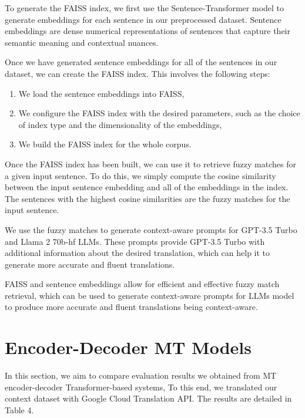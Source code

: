 \documentclass{article}
\begin{document}
To generate the FAISS index, we first use the Sentence-Transformer model to generate embeddings for each sentence in our preprocessed dataset. Sentence embeddings are dense numerical representations of sentences that capture their semantic meaning and contextual nuances.


Once we have generated sentence embeddings for all of the sentences in our dataset, we can create the FAISS index. This involves the following steps:


\begin{enumerate}
	\item We load the sentence embeddings into FAISS,
	
	
	\item We configure the FAISS index with the desired parameters, such as the choice of index type and the dimensionality of the embeddings,
	
	
	\item We build the FAISS index for the whole corpus.
	
\end{enumerate}

Once the FAISS index has been built, we can use it to retrieve fuzzy matches for a given input sentence. To do this, we simply compute the cosine similarity between the input sentence embedding and all of the embeddings in the index. The sentences with the highest cosine similarities are the fuzzy matches for the input sentence.

We use the fuzzy matches to generate context-aware prompts for GPT-3.5 Turbo and Llama 2 70b-hf LLMs. These prompts provide GPT-3.5 Turbo with additional information about the desired translation, which can help it to generate more accurate and fluent translations.

FAISS and sentence embeddings allow for efficient and effective fuzzy match retrieval, which can be used to generate context-aware prompts for LLMs model to produce more accurate and fluent translations being context-aware.


\section{Encoder-Decoder MT Models}
In this section, we aim to compare evaluation
results we obtained from MT encoder-decoder Transformer-based systems\cite{vaswani2017attention}, To this end,
we translated our context dataset with Google Cloud Translation API. The results are detailed in Table 4.
\end{document}
